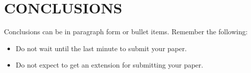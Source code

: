 \section{CONCLUSIONS}
\label{sec:conclusions}

Conclusions can be in paragraph form or bullet items. Remember the following:
\begin{itemize}[leftmargin=0.6cm,itemsep=0pt,parsep=0pt,topsep=0pt]
    \item Do not wait until the last minute to submit your paper. 
    \item Do not expect to get an extension for submitting your paper. 
\end{itemize}
